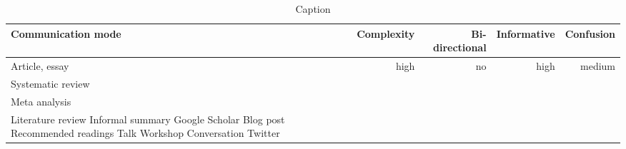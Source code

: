 \begin{table*}\centering
{}
\begin{tabular}{@{}lrrrr@{}}\toprule
Communication mode & Complexity & Bi-directional & Informative  & Confusion
\\\midrule
Article, essay & high & no & high & medium  \\
Systematic review \\
Meta analysis \\
Literature review
Informal summary
Google Scholar
Blog post
Recommended readings
Talk
Workshop
Conversation
Twitter


\bottomrule
\end{tabular}
\caption{Caption}
\end{table*}